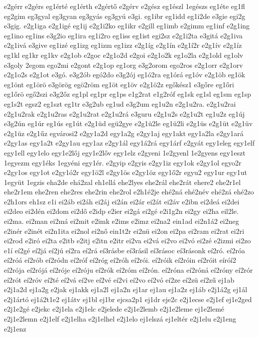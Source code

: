 {e2gérr
e2gérs
eg1érté
eg1érth
e2gértő
e2gérv
e2gész
eg1észl
1egészs
eg1éte
eg1fl
eg2gim
eg3gyal
eg3gyan
eg3gyás
eg3gyú
e3gi.
eg1ibr
eg1idd
eg1i2de
e3gie
egi2g
e3gig.
e2g1iga
e2g1igé
eg1ij
e2g1i2ko
eg1ikr
e2gill
eg1imb
e2gimm
eg1inf
e2g1ing
eg1ino
eg1ins
e3g2io
eg1ira
eg1i2ro
eg1iss
eg1ist
egi2sz
e2g1i2ta
e3gitá
e2g1iva
e2g1ivá
e3give
eg1izé
eg1izg
eg1izm
eg1izz
e2g1íg
e2g1ín
e2g1í2r
e2g1ív
e2g1íz
eg1kl
eg1kr
eg1kv
e2g1ob
e2goc
e2g1o2d
e2goi
e2g1o2k
eg1o2la
e2g1old
eg1olv
e3goly
2egom
ego2mi
e2gont
e2g1op
eg1org
e3g2orom
ego2ros
e2g1orr
e2g1orv
e2g1o2s
e2g1ot
e3gó.
e3g2ób
egó2do
e3g2ój
eg1ó2ra
eg1órá
eg1óv
e2g1öb
eg1ök
eg1önt
eg1örö
e3görög
egö2röm
eg1öt
eg1öv
e2g1ö2z
egőkész1
e3gőre
eg1őri
eg1őrö
egő2szi
e3g2őz
eg1pl
eg1pr
eg1ps
e1g2rat
e1g2róf
eg1sk
eg1sl
eg1sm
eg1sp
eg1s2t
egsz2
eg1szt
eg1tr
e3g2ub
eg1ud
e3g2um
eg1u2n
e2g1u2ra.
e2g1u2rai
e2g1u2rak
e2g1u2ras
e2g1u2rat
e2g1u2rá
e3guru
e2g1u2s
e2g1u2t
eg1u2z
eg1új
e3g2ún
eg1úr
eg1ús
eg1út
e2g1üd
egü2gye
e2g1ü2le
eg1ü2li
e2g1üs
e2g1üt
e2g1üv
e2g1üz
e2g1űz
egvárosi2
e2gy1a2d
egy1a2g
e2gy1aj
egy1akt
egy1a2la
e2gy1ará
e2gy1as
egy1a2t
e2gy1au
egy1az
e2gy1ál
egy1á2rá
egy1árf
e2gyát
egy1eleg
egy1elf
egy1ell
egy1elo
egy1e2lőj
egy1e2lőv
egy1elz
e2gyeni
1e2gyenl
1e2gyens
egy1eszt
1egyezm
egy1éks
1egyéni
egy1ér.
e2gyip
e2gyis
e2gy1iz
egy1ok
e2gy1ol
egyo2r
e2gy1os
egy1ot
e2gy1ó2r
egy1ö2l
e2gy1ös
e2gy1öz
egy1ő2r
egyu2
egy1ur
egy1ut
1együt
1egzis
eha2de
ehá2zal
eh1ellá
ehe2lyes
ehe2rál
ehe2rát
ehere2
ehe2r1el
ehe2r1em
ehe2ren
ehe2res
ehe2rin
ehe2rol
e2h1é2je
ehé2ná
ehé2név
ehé2zá
ehé2zo
e2h1ors
eh1sz
e1i
ei2áb
ei2áh
ei2áj
ei2án
ei2ár
ei2át
ei2áv
e2ibn
ei2deá
ei2dei
ei2deo
ei2dén
ei2dom
ei2dő
e2idp
e2ier
ei2gá
ei2gé
e2i1g2n
ei2gy
ei2ha
eil2le.
ei2ma.
ei2man
ei2má
ei2mit
e2imk
e2ims
e2imz
ei2na2
ein1ad
ei2n1á2
ei2neg
e2inér
e2inét
ei2n1ita
ei2nol
ei2nő
ein1t2r
ei2nü
ei2on
ei2pa
ei2ram
ei2rat
ei2ri
ei2rod
e2iró
ei2ta
e2itb
e2itj
e2itn
e2itr
ei2va
ei2vá
ei2vo
ei2vó
ei2zé
e2izmi
ei2zo
e1í
eí2gé
eí2já
eí2jú
eí2ra
eí2rá
eí3rásbe
eí3rásil
eí3rásoc
eí3rásonk
eí2ró.
eí2róa
eí2róá
eí2rób
eí2ródn
eí2róf
eí2róg
eí2róh
eí2rói.
eí2róik
eí2róin
eí2róit
eíróí2
eí2rója
eí2rójá
eí2róje
eí2róju
eí2rók
eí2róm
eí2rón.
eí2róna
eí2róná
eí2róny
eí2rór
eí2rót
eí2róv
eí2té
eí2vá
eí2ve
eí2vé
eí2vi
eí2vo
eí2vó
eí2ze
eí2zü
eí2zű
ej1ab
e2j1a2d
ej1a2g
e2jak
ej1akk
ej1a2l
ej1a2n
ej1ar
ej1au
ej1a2z
ej1áb
e2j1á2g
ej1ál
e2j1ártó
ej1á2t1e2
ej1átv
ej1bl
ej1br
ejcsa2p1
ej1dr
eje2c
e2j1ecse
e2j1ef
ej1e2ged
e2j1e2gé
e2jekc
e2j1ela
e2j1elc
e2jelede
e2j1e2lemb
e2j1e2leme
ej1e2lemé
e2j1e2lemn
e2j1elf
e2j1elha
e2j1elhel
e2j1elo
ej1elszá
ej1eltér
e2j1elu
e2j1eng
e2j1enz
}
